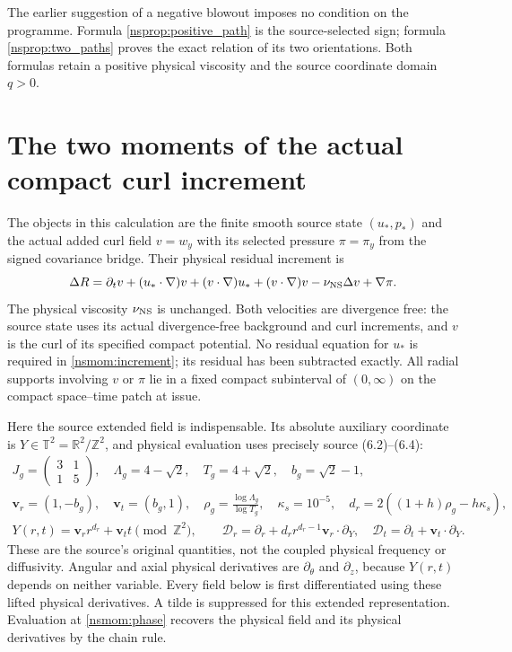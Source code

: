 The earlier suggestion of a negative blowout imposes no condition on
the programme. Formula \eqref{nsprop:positive_path} is the source-selected
sign; formula \eqref{nsprop:two_paths} proves the exact relation of its
two orientations. Both formulas retain a positive physical viscosity
and the source coordinate domain $q>0$.


\section{The two moments of the actual compact curl increment}
\label{nsmom:setup}
The objects in this calculation are the finite smooth source state
$(u_*,p_*)$ and the actual added curl field $v=w_y$ with its selected
pressure $\pi=\pi_y$ from the signed covariance bridge. Their physical
residual increment is
\begin{equation}
 \Delta R=\partial_t v+(u_*\cdot\nabla)v+(v\cdot\nabla)u_*
 +(v\cdot\nabla)v-\nu_{\rm NS}\Delta v+\nabla\pi .
 \label{nsmom:increment}
\end{equation}
The physical viscosity $\nu_{\rm NS}$ is unchanged. Both velocities are
divergence free: the source state uses its actual divergence-free
background and curl increments, and $v$ is the curl of its specified
compact potential. No residual equation for $u_*$ is required in
\eqref{nsmom:increment}; its residual has been subtracted exactly.
All radial supports involving $v$ or $\pi$ lie in a fixed compact
subinterval of $(0,\infty)$ on the compact space--time patch at issue.

Here the source extended field is indispensable. Its absolute auxiliary
coordinate is $Y\in\mathbb T^2=\mathbb R^2/\mathbb Z^2$, and physical
evaluation uses precisely source (6.2)--(6.4):
\begin{gather}
 J_g=\begin{pmatrix}3&1\\1&5\end{pmatrix},\quad
 \Lambda_g=4-\sqrt2,\quad T_g=4+\sqrt2,\quad b_g=\sqrt2-1,\nonumber\\
 \mathbf v_r=(1,-b_g),\quad\mathbf v_t=(b_g,1),\quad
 \rho_g=\frac{\log\Lambda_g}{\log T_g},\quad
 \kappa_s=10^{-5},\quad d_r=2((1+h)\rho_g-h\kappa_s),\nonumber\\
 Y(r,t)=\mathbf v_r r^{d_r}+\mathbf v_t t\pmod{\mathbb Z^2},\qquad
 \mathscr D_r=\partial_r+d_r r^{d_r-1}\mathbf v_r\cdot\partial_Y,
 \quad\mathscr D_t=\partial_t+\mathbf v_t\cdot\partial_Y.
 \label{nsmom:phase}
\end{gather}
These are the source's original quantities, not the coupled physical
frequency or diffusivity. Angular and axial physical derivatives are
$\partial_\theta$ and $\partial_z$, because $Y(r,t)$ depends on neither
variable. Every field below is first differentiated using these lifted
physical derivatives. A tilde is suppressed for this extended
representation. Evaluation at \eqref{nsmom:phase} recovers the physical
field and its physical derivatives by the chain rule.

